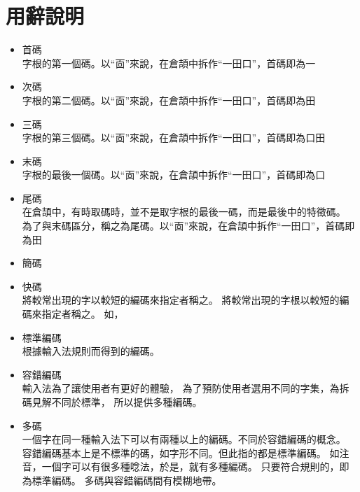 \section{用辭說明}
\begin{itemize}
\item 首碼\\
字根的第一個碼。以``靣''來說，在倉頡中拆作``一田口''，首碼即為一\\
\item 次碼\\
字根的第二個碼。以``靣''來說，在倉頡中拆作``一田口''，首碼即為田\\
\item 三碼\\
字根的第三個碼。以``靣''來說，在倉頡中拆作``一田口''，首碼即為口田\\
\item 末碼\\
字根的最後一個碼。以``靣''來說，在倉頡中拆作``一田口''，首碼即為口\\
\item 尾碼\\
在倉頡中，有時取碼時，並不是取字根的最後一碼，而是最後中的特徵碼。\\
為了與末碼區分，稱之為尾碼。以``靣''來說，在倉頡中拆作``一田口''，首碼即為田
 
\item 簡碼\\
\item 快碼\\
將較常出現的字以較短的編碼來指定者稱之。
將較常出現的字根以較短的編碼來指定者稱之。
如，

\item 標準編碼\\
根據輸入法規則而得到的編碼。

\item 容錯編碼\\
輸入法為了讓使用者有更好的體驗，
為了預防使用者選用不同的字集，為拆碼見解不同於標準，
所以提供多種編碼。

\item 多碼\\
一個字在同一種輸入法下可以有兩種以上的編碼。不同於容錯編碼的概念。\\
      容錯編碼基本上是不標準的碼，如字形不同。但此指的都是標準編碼。
      如注音，一個字可以有很多種唸法，於是，就有多種編碼。
      只要符合規則的，即為標準編碼。
      多碼與容錯編碼間有模糊地帶。

%
\end{itemize}


